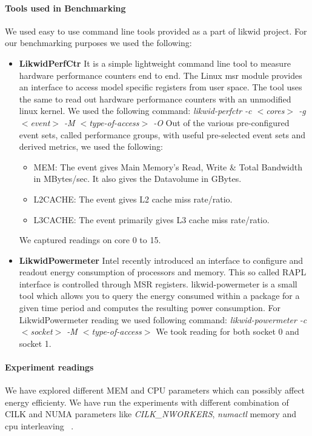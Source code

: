 \paragraph{Tools used in Benchmarking}
We used easy to use command line tools provided as a part of likwid
project. For our benchmarking purposes we used the following:
\begin{itemize}[leftmargin=*]
\item \textbf{LikwidPerfCtr}
It is a simple lightweight command line tool to measure hardware 
performance counters end to end. The Linux msr module provides
an interface to access model specific registers from user space.
The tool uses the same to read out hardware
performance counters with an unmodified linux kernel. We used the 
following command:\newline
\emph{likwid-perfctr -c $<$cores$>$ -g $<$event$>$ -M $<$type-of-access$>$ -O}\newline
Out of the various pre-configured event sets, called performance groups, with
useful pre-selected event sets and derived metrics, we used the 
following:
\begin{itemize}[leftmargin=*]
\item MEM: The event gives Main Memory's Read, Write \& Total 
Bandwidth in MBytes/sec. It also gives the Datavolume in GBytes.
\item L2CACHE: The event gives L2 cache miss rate/ratio.
\item L3CACHE: The event primarily gives L3 cache miss rate/ratio.
\end{itemize}
We captured readings on core 0 to 15.
\item \textbf{LikwidPowermeter}
Intel recently introduced an interface to configure and readout 
energy consumption of processors and memory. This so called RAPL 
interface is controlled through MSR registers. likwid-powermeter 
is a small tool which allows you to query the energy consumed within 
a package for a given time period and computes the resulting power 
consumption. For LikwidPowermeter reading we used following command:\newline
\emph{likwid-powermeter -c $<$socket$>$ -M $<$type-of-access$>$}\newline
We took reading for both socket 0 and socket 1.
\end{itemize}


\paragraph{Experiment readings}
We have explored different MEM and CPU parameters which can possibly
affect energy efficienty.  We have run the experiments with different
combination of CILK and NUMA parameters like \emph{CILK\_NWORKERS},
\emph{numactl} memory and cpu interleaving ~\cite{NUMA-MAN}.

